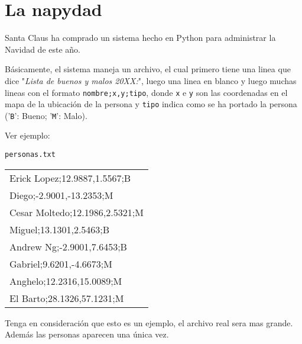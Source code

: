 \section{La napydad}

Santa Claus ha comprado un sistema hecho en Python para administrar la Navidad de este año.

Básicamente, el sistema maneja un archivo, el cual primero tiene una linea que dice "\textit{Lista de buenos y malos 20XX:}", luego una linea en blanco y luego muchas lineas con el formato \texttt{nombre;x,y;tipo}, donde \texttt{x} e \texttt{y} son las coordenadas en el mapa de la ubicación de la persona y \texttt{tipo} indica como se ha portado la persona ('\texttt{B}': Bueno; '\texttt{M}': Malo).

Ver ejemplo:
\begin{center}
\texttt{personas.txt}\\
	\begin{tabular}{|l|}
		\hline
Erick Lopez;12.9887,1.5567;B\\
Diego;-2.9001,-13.2353;M\\
Cesar Moltedo;12.1986,2.5321;M\\
Miguel;13.1301,2.5463;B\\
Andrew Ng;-2.9001,7.6453;B\\
Gabriel;9.6201,-4.6673;M\\
Anghelo;12.2316,15.0089;M\\
El Barto;28.1326,57.1231;M\\
		\hline
	\end{tabular}
\end{center}

Tenga en consideración que esto es un ejemplo, el archivo real sera mas grande. Además las personas aparecen una única vez.

